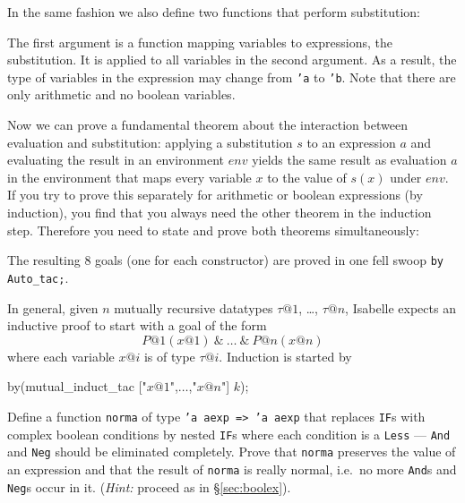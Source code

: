 
In the same fashion we also define two functions that perform substitution:
\begin{ttbox}
\end{ttbox}
The first argument is a function mapping variables to expressions, the
substitution. It is applied to all variables in the second argument. As a
result, the type of variables in the expression may change from \texttt{'a}
to \texttt{'b}. Note that there are only arithmetic and no boolean variables.
\begin{ttbox}

\end{ttbox}

Now we can prove a fundamental theorem about the interaction between
evaluation and substitution: applying a substitution $s$ to an expression $a$
and evaluating the result in an environment $env$ yields the same result as
evaluation $a$ in the environment that maps every variable $x$ to the value
of $s(x)$ under $env$. If you try to prove this separately for arithmetic or
boolean expressions (by induction), you find that you always need the other
theorem in the induction step. Therefore you need to state and prove both
theorems simultaneously:
\begin{quote}\small

\end{quote}
The resulting 8 goals (one for each constructor) are proved in one fell swoop
\texttt{by Auto_tac;}.

In general, given $n$ mutually recursive datatypes $\tau@1$, \dots, $\tau@n$,
Isabelle expects an inductive proof to start with a goal of the form
\[ P@1(x@1)\ \texttt{\&}\ \dots\ \texttt{\&}\ P@n(x@n) \]
where each variable $x@i$ is of type $\tau@i$. Induction is started by
\begin{ttbox}
by(mutual_induct_tac ["\(x@1\)",\(\dots\),"\(x@n\)"] \(k\));
\end{ttbox}

\begin{exercise}
  Define a function \texttt{norma} of type \texttt{'a aexp => 'a aexp} that
  replaces \texttt{IF}s with complex boolean conditions by nested
  \texttt{IF}s where each condition is a \texttt{Less} --- \texttt{And} and
  \texttt{Neg} should be eliminated completely. Prove that \texttt{norma}
  preserves the value of an expression and that the result of \texttt{norma}
  is really normal, i.e.\ no more \texttt{And}s and \texttt{Neg}s occur in
  it.  ({\em Hint:} proceed as in \S\ref{sec:boolex}).
\end{exercise}

